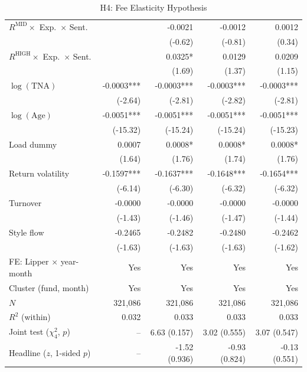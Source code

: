 \begin{table}[!htbp]
{\begin{tabular*}{\linewidth}{@{\extracolsep{\fill}}lrrrr}
$R^{\text{MID}}\times$ Exp.\ $\times$ Sent. &  & -0.0021 & -0.0012 & 0.0012\\
 &  & (-0.62) & (-0.81) & (0.34)\\
$R^{\text{HIGH}}\times$ Exp.\ $\times$ Sent. &  & 0.0325* & 0.0129 & 0.0209\\
 &  & (1.69) & (1.37) & (1.15)\\
$\log(\text{TNA})$ & -0.0003*** & -0.0003*** & -0.0003*** & -0.0003***\\
 & (-2.64) & (-2.81) & (-2.82) & (-2.81)\\
$\log(\text{Age})$ & -0.0051*** & -0.0051*** & -0.0051*** & -0.0051***\\
 & (-15.32) & (-15.24) & (-15.24) & (-15.23)\\
Load dummy & 0.0007 & 0.0008* & 0.0008* & 0.0008*\\
 & (1.64) & (1.76) & (1.74) & (1.76)\\
Return volatility & -0.1597*** & -0.1637*** & -0.1648*** & -0.1654***\\
 & (-6.14) & (-6.30) & (-6.32) & (-6.32)\\
Turnover & -0.0000 & -0.0000 & -0.0000 & -0.0000\\
 & (-1.43) & (-1.46) & (-1.47) & (-1.44)\\
Style flow & -0.2465 & -0.2482 & -0.2480 & -0.2462\\
 & (-1.63) & (-1.63) & (-1.63) & (-1.62)\\
\midrule
FE: Lipper $\times$ year-month & Yes & Yes & Yes & Yes\\
Cluster (fund, month) & Yes & Yes & Yes & Yes\\
$N$ & 321,086 & 321,086 & 321,086 & 321,086\\
$R^2$ (within) & 0.032 & 0.033 & 0.033 & 0.033\\
Joint test ($\chi^2_4$, $p$) & -- & 6.63 (0.157) & 3.02 (0.555) & 3.07 (0.547)\\
Headline ($z$, 1-sided $p$) & -- & -1.52 (0.936) & -0.93 (0.824) & -0.13 (0.551)\\
\bottomrule
\end{tabular*}%
}\sbefit
\fi
\setlength{\tabletempwidth}{\wd\tabletempbox}
\ifdim\tabletempwidth>\linewidth\setlength{\tabletempwidth}{\linewidth}\fi
\begin{minipage}{\tabletempwidth}
\captionsetup{width=\linewidth}
\caption{H4: Fee Elasticity Hypothesis}\label{tab:H4_regression}
\ifdim\wd\tabletempbox>\linewidth
  \resizebox{\linewidth}{!}{\usebox{\tabletempbox}}
\else
  \usebox{\tabletempbox}
\fi

\end{minipage}
\end{table}
